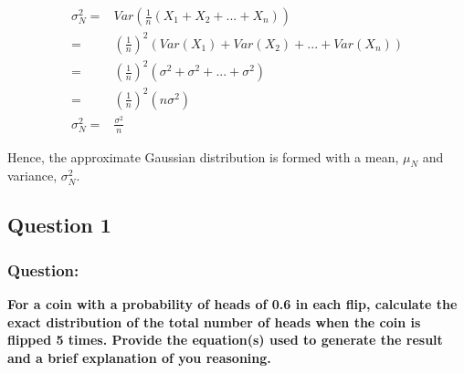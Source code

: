 \documentclass[12pt,twoside,a4paper]{article}
\begin{document}
\begin{align}
\sigma^2_N =& Var\left( \frac{1}{n}(X_1+X_2+...+X_n) \right ) \\
           =& \left( \frac{1}{n} \right )^2 \left(Var(X_1)+Var(X_2)+...+Var(X_n) \right ) \\
           =& \left( \frac{1}{n} \right )^2 \left(\sigma^2+\sigma^2+...+\sigma^2 \right ) \\
           =& \left( \frac{1}{n} \right )^2(n\sigma^2) \\
\sigma^2_N =& \frac{\sigma^2}{n}
\end{align}

Hence, the approximate Gaussian distribution is formed with a mean, $\mu_N$ and variance, $\sigma^2_N$.
\subsection{Question 1}

\subsubsection*{Question:}
\textbf{For a coin with a probability of heads of 0.6 in each flip, calculate the exact distribution of the total number of heads when the coin is flipped 5 times. Provide the equation(s) used to generate the result and a brief explanation of you reasoning.}
\end{document}

